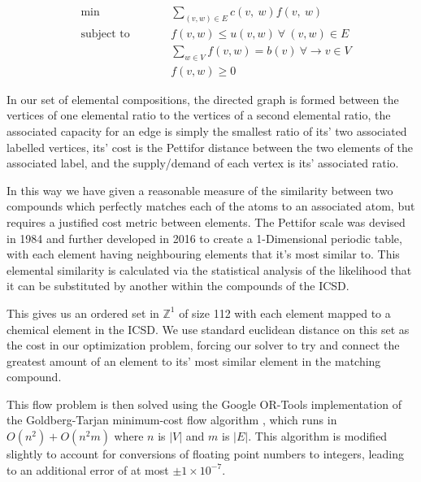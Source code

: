 \documentclass{article}
\begin{document}
\begin{subequations}
   \begin{alignat}{2}
   &\!\min\ &\qquad& \sum_{(v, w)\in E} c(v,\ w)f(v,\ w)\label{eq:optProb}\\
   &\text{subject to} & & f(v, w) \leq u(v, w)\ \forall\ (v, w) \in E \label{eq:constraint1}\\
   &                  &      & \sum_{w \in V} f(v, w) = b(v)\ \forall\rightarrow v \in V \label{eq:constraint2} \\
   &                  &      & f(v, w) \geq 0\label{eq:constraint3}
   \end{alignat}
\end{subequations}

In our set of elemental compositions, the directed graph is formed between the vertices of one elemental ratio to the vertices of a second elemental ratio, the associated capacity for an edge is simply the smallest ratio of its' two associated labelled vertices, its' cost is the Pettifor distance between the two elements of the associated label, and the supply/demand of each vertex is its' associated ratio.

In this way we have given a reasonable measure of the similarity between two compounds which perfectly matches each of the atoms to an associated atom, but requires a justified cost metric between elements. The Pettifor scale was devised in 1984 \cite{PETTIFOR198431} and further developed in 2016 \cite{Glawe_2016} to create a 1-Dimensional periodic table, with each element having neighbouring elements that it's most similar to. This elemental similarity is calculated via the statistical analysis of the likelihood that it can be substituted by another within the compounds of the ICSD.

This gives us an ordered set in $\mathbb{Z}^1$ of size 112 with each element mapped to a chemical element in the ICSD. We use standard euclidean distance on this set as the cost in our optimization problem, forcing our solver to try and connect the greatest amount of an element to its' most similar element in the matching compound.

This flow problem is then solved using the Google OR-Tools \cite{GoogOrTool} implementation of the Goldberg-Tarjan minimum-cost flow algorithm \cite{Bünnagel_efficientimplementation}, which runs in $O(n^2) + O(n^2m)$ where $n$ is $|V|$ and $m$ is $|E|$. This algorithm is modified slightly to account for conversions of floating point numbers to integers, leading to an additional error of at most $\pm 1 \times 10^{-7}$.
\end{document}

